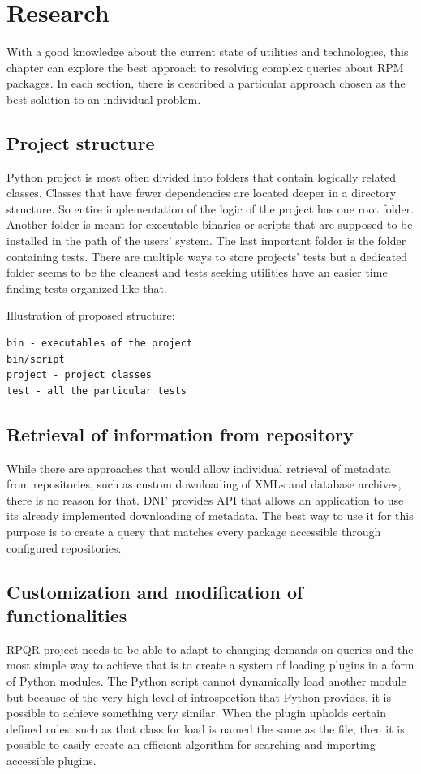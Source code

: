 \chapter{Research}
With a good knowledge about the current state of utilities and technologies, this chapter can explore
the best approach to resolving complex queries about RPM packages. In each section,
there is described a particular approach chosen as the best solution to an individual problem.

\section{Project structure}
Python project is most often divided into folders that contain logically related classes.
Classes that have fewer dependencies are located deeper in a directory structure. So entire
implementation of the logic of the project has one root folder. Another folder is meant for executable
binaries or scripts that are supposed to be installed in the path of the users' system. The last important
folder is the folder containing tests. There are multiple ways to store projects' tests but a dedicated folder
seems to be the cleanest and tests seeking utilities have an easier time finding tests organized 
like that.

Illustration of proposed structure:

\begin{lstlisting}
bin - executables of the project
bin/script
project - project classes
test - all the particular tests
\end{lstlisting}

\newpage

\section{Retrieval of information from repository}
While there are approaches that would allow individual retrieval of metadata from repositories,
such as custom downloading of XMLs and database archives, there is no reason for that. DNF provides
API\cite{DNFPackageManager} that allows an application to use its already implemented downloading of metadata.
The best way to use it for this purpose is to create a query that matches every package
accessible through configured repositories.

\section{Customization and modification of functionalities}
RPQR project needs to be able to adapt to changing demands on queries and the most simple way to
achieve that is to create a system of loading plugins in a form of Python modules. The Python script cannot dynamically load another module but because of the very
high level of introspection that Python provides, it is possible to achieve something very similar.
When the plugin upholds certain defined rules, such as that class for load is named the same as the file,
then it is possible to easily create an efficient algorithm for searching and importing accessible
plugins.

